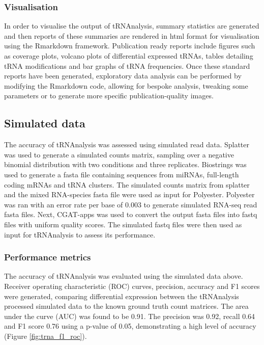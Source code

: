 \subsubsection{Visualisation}
In order to visualise the output of tRNAnalysis, summary statistics are generated and then reports of these summaries are rendered in html format for visualisation using the Rmarkdown framework.
Publication ready reports include figures such as coverage plots, volcano plots of differential expressed tRNAs, tables detailing tRNA modifications and bar graphs of tRNA frequencies.
Once these standard reports have been generated, exploratory data analysis can be performed by modifying the Rmarkdown code, allowing for bespoke analysis, tweaking some parameters or to generate more specific publication-quality images.

\subsection{Simulated data}
The accuracy of tRNAnalysis was assessed using simulated read data.
Splatter\cite{zappia2017splatter} was used to generate a simulated counts matrix, sampling over a negative binomial distribution with two conditions and three replicates.
Biostrings\cite{pages2013package} was used to generate a fasta file containing sequences from miRNAs, full-length coding mRNAs and tRNA clusters.
The simulated counts matrix from splatter and the mixed RNA-species fasta file were used as input for Polyester\cite{frazee2015polyester}.
Polyester was ran with an error rate per base of 0.003 to generate simulated RNA-seq read fasta files.
Next, CGAT-apps\cite{sims2014cgat} was used to convert the output fasta files into fastq files with uniform quality scores.
The simulated fastq files were then used as input for tRNAnalysis to assess its performance.

\subsubsection{Performance metrics}
The accuracy of tRNAnalysis was evaluated using the simulated data above.
Receiver operating characteristic (ROC) curves, precision, accuracy and F1 scores were generated, comparing differential expression between the tRNAnalysis processed simulated data to the known ground truth count matrices.
The area under the curve (AUC) was found to be 0.91.
The precision was 0.92, recall 0.64 and F1 score 0.76 using a p-value of 0.05, demonstrating a high level of accuracy (Figure \ref{fig:trna_f1_roc}).

